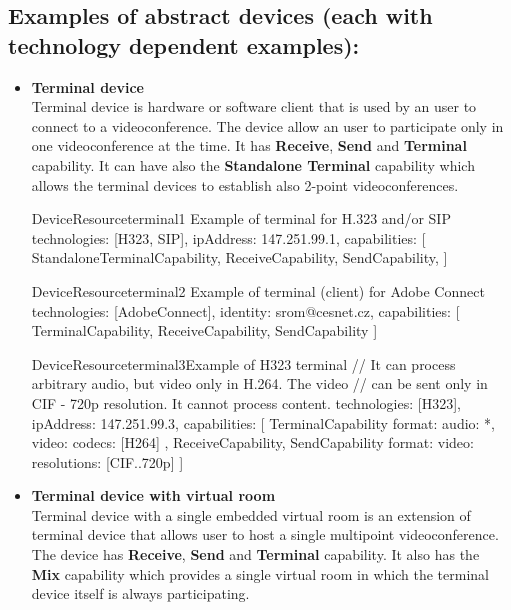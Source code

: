 \subsection*{Examples of abstract devices (each with technology dependent 
             examples):}

\begin{itemize}

\item \textbf{Terminal device} \\
  Terminal device is hardware or software client that is used by an user to 
  connect to a videoconference. The device allow an user to participate only 
  in one videoconference at the time. It has \textbf{Receive}, \textbf{Send} 
  and \textbf{Terminal} capability. It can have also the 
  \textbf{Standalone Terminal} capability which allows the terminal devices to  
  establish also 2-point videoconferences. 
  
\begin{ResourceExample}{DeviceResource}{terminal1}%
      {Example of terminal for H.323 and/or SIP}
technologies: [H323, SIP],
ipAddress: 147.251.99.1,
capabilities: [
  StandaloneTerminalCapability,
  ReceiveCapability,
  SendCapability, 
]
\end{ResourceExample}

\begin{ResourceExample}{DeviceResource}{terminal2}%
      {Example of terminal (client) for Adobe Connect}
technologies: [AdobeConnect],
identity: srom@cesnet.cz,
capabilities: [
  TerminalCapability,
  ReceiveCapability,
  SendCapability
]
\end{ResourceExample}

\begin{ResourceExample}{DeviceResource}{terminal3}{Example of H323 terminal}
// It can process arbitrary audio, but video only in H.264. The video
// can be sent only in CIF - 720p resolution. It cannot process content.
technologies: [H323],
ipAddress: 147.251.99.3,
capabilities: [
  TerminalCapability {
    format: {
      audio: *,
      video: {codecs: [H264]}
    }
  },
  ReceiveCapability,
  SendCapability {
    format: {
      video: {resolutions: [CIF..720p]}
    }
  }
]
\end{ResourceExample}

\item \textbf{Terminal device with virtual room} \\
  Terminal device with a single embedded virtual room is an extension of 
  terminal device that allows user to host a single multipoint 
  videoconference. The  device has \textbf{Receive}, \textbf{Send} and
  \textbf{Terminal} capability. It also has the \textbf{Mix} capability
  which provides a single virtual room in which the terminal device itself is 
  always participating.
  

\end{itemize}
